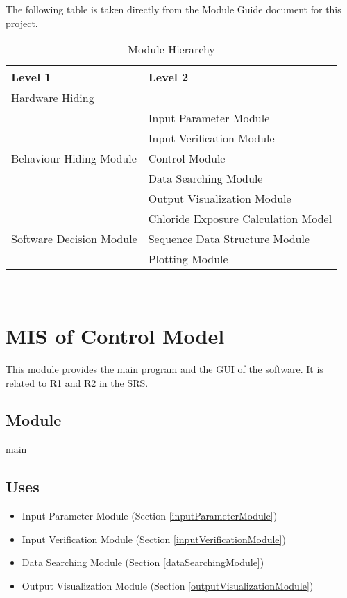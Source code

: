 \documentclass[12pt, titlepage]{article}
\begin{document}
The following table is taken directly from the Module Guide document for this project.

\begin{table}[h!]
\centering
\begin{tabular}{p{} p{}}
\toprule
\textbf{Level 1} & \textbf{Level 2}\\
\midrule

{Hardware Hiding} & ~ \\
\midrule

\multirow{5}{0.3\textwidth}{Behaviour-Hiding Module} & Input Parameter Module\\
& Input Verification Module\\
& Control Module\\
& Data Searching Module\\
& Output Visualization Module\\

\midrule

\multirow{3}{0.3\textwidth}{Software Decision Module} & Chloride Exposure Calculation Model \\
& Sequence Data Structure Module \\
& Plotting Module \\
\bottomrule

\end{tabular}
\caption{Module Hierarchy}
\label{TblMH}
\end{table}

\newpage
~\newpage

\section{MIS of Control Model} \label{controlModule} 
This module provides the main program and the GUI of the software. It is related to R1 and R2 in the SRS.


\subsection{Module}

main

\subsection{Uses}
\begin{itemize}
\item Input Parameter Module (Section \ref{inputParameterModule})
\item Input Verification Module (Section \ref{inputVerificationModule})
\item Data Searching Module (Section \ref{dataSearchingModule})
\item Output Visualization Module (Section \ref{outputVisualizationModule})
\end{itemize}
\end{document}
